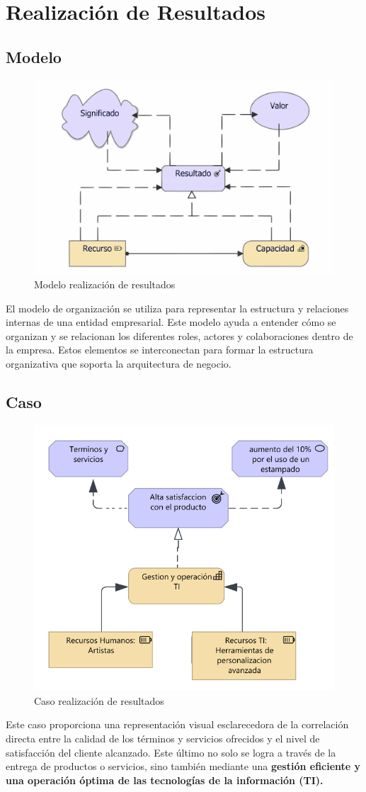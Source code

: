\newpage
\section{Realización de Resultados}
\subsection{Modelo}
\begin{figure}[H]
	\centering	
    \includegraphics[width=0.7\linewidth]{imgs/RealizaciondeResultadoM.pdf}
	\caption{Modelo realización de resultados}
\end{figure}
El modelo de organización se utiliza para representar la estructura y relaciones internas de una entidad empresarial. Este modelo ayuda a entender cómo se organizan y se relacionan los diferentes roles, actores y colaboraciones dentro de la empresa. Estos elementos se interconectan para formar la estructura organizativa que soporta la arquitectura de negocio.
\subsection{Caso}
\begin{figure}[H]
	\centering	
    \includegraphics[width=0.7\linewidth]{imgs/Caso 2.png}
	\caption{Caso realización de resultados}	
 \end{figure}
Este caso proporciona una representación visual esclarecedora de la correlación directa entre la calidad de los términos y servicios ofrecidos y el nivel de satisfacción del cliente alcanzado. Este último no solo se logra a través de la entrega de productos o servicios, sino también mediante una \textbf{gestión eficiente y una operación óptima de las tecnologías de la información (TI).}

